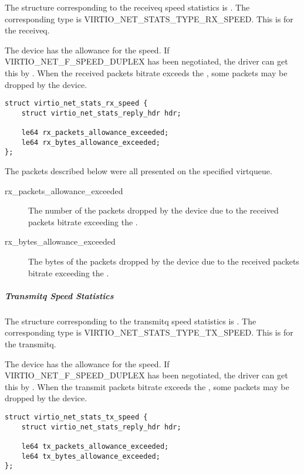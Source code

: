 The structure corresponding to the receiveq speed statistics is
. The corresponding type is
VIRTIO_NET_STATS_TYPE_RX_SPEED. This is for the receiveq.

The device has the allowance for the speed. If VIRTIO_NET_F_SPEED_DUPLEX has
been negotiated, the driver can get this by . When the received
packets bitrate exceeds the , some packets may be dropped by the
device.

\begin{lstlisting}
struct virtio_net_stats_rx_speed {
    struct virtio_net_stats_reply_hdr hdr;

    le64 rx_packets_allowance_exceeded;
    le64 rx_bytes_allowance_exceeded;
};
\end{lstlisting}

The packets described below were all presented on the specified virtqueue.
\begin{description}
    \item [rx_packets_allowance_exceeded]
        The number of the packets dropped by the device due to the received
        packets bitrate exceeding the .

    \item [rx_bytes_allowance_exceeded]
        The bytes of the packets dropped by the device due to the received
        packets bitrate exceeding the .

\end{description}

\subparagraph{Transmitq Speed Statistics}\label{sec:Device Types / Network Device / Device Operation / Control Virtqueue / Device Statistics / Transmitq Speed Statistics}

The structure corresponding to the transmitq speed statistics is
. The corresponding type is
VIRTIO_NET_STATS_TYPE_TX_SPEED. This is for the transmitq.

The device has the allowance for the speed. If VIRTIO_NET_F_SPEED_DUPLEX has
been negotiated, the driver can get this by . When the transmit
packets bitrate exceeds the , some packets may be dropped by the
device.

\begin{lstlisting}
struct virtio_net_stats_tx_speed {
    struct virtio_net_stats_reply_hdr hdr;

    le64 tx_packets_allowance_exceeded;
    le64 tx_bytes_allowance_exceeded;
};
\end{lstlisting}

